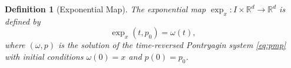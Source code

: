 \documentclass{article}
\newtheorem{definition}[theorem]{Definition}
\newtheorem{assumption}[theorem]{Assumption}
\newcommand{\Rd}{\mathbb{R}^d}
\begin{document}
\begin{definition}[Exponential Map]
\label{def:exp-map}
The exponential map $\exp_x: I \times \mathbb{R}^d \rightarrow \mathbb{R}^d$ is defined by 
\[\exp_x(t,p_0) = \omega(t),\]
where $(\omega,p)$ is the solution of the time-reversed Pontryagin system \eqref{eq:pmp} with initial conditions $\omega(0) = x$ and $p(0) = p_0$.
\end{definition}








\end{document}
